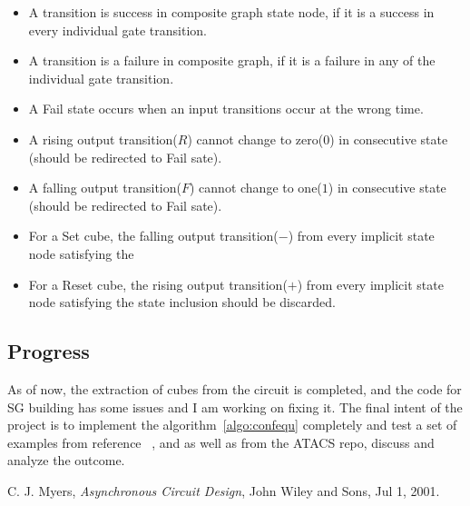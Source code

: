 \documentclass[10pt,journal,compsoc]{IEEEtran}
\begin{document}
\begin{itemize}
\item A transition is success in composite graph state node, if it is a success in every individual
gate transition. 
\item A transition is a failure in composite graph, if it is a failure in any of the individual gate transition.
\item A Fail state occurs when an input transitions occur at the wrong time.
\item A rising output transition($R$) cannot change to zero($0$) in consecutive state (should be redirected to Fail
sate).
\item A falling output transition($F$) cannot change to one($1$) in consecutive state (should be redirected to Fail
sate).
\item For a Set cube, the falling output transition($-$) from every implicit state node satisfying the
\item For a Reset cube, the rising output transition($+$) from every implicit state node satisfying the
state inclusion should be discarded.
\end{itemize}

\subsection{Progress}
As of now, the extraction of cubes from the circuit is completed, and the code for SG building has some issues and I am working on fixing it. The final intent 
of the project is to implement the algorithm~\ref{algo:confequ} completely and test a set of examples from reference ~\cite{IEEEhowto:cjmyers}, and as well as from the ATACS repo, discuss and analyze the outcome.

\begin{thebibliography}{1}

C. J. Myers, \emph{{A}synchronous {C}ircuit {D}esign}, John Wiley and Sons, Jul 1, 2001.

\end{thebibliography}

\end{document}
